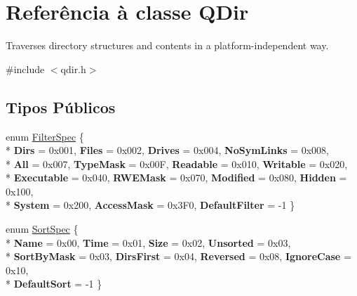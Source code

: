 \hypertarget{class_q_dir}{\section{Referência à classe Q\-Dir}
\label{class_q_dir}
}


Traverses directory structures and contents in a platform-\/independent way.  




{\ttfamily \#include $<$qdir.\-h$>$}

\subsection*{Tipos Públicos}
\begin{DoxyCompactItemize}
\item 
enum \hyperlink{class_q_dir_ae5939bcf9175d1742ed9c51e042efd50}{Filter\-Spec} \{ \\*
{\bfseries Dirs} = 0x001, 
{\bfseries Files} = 0x002, 
{\bfseries Drives} = 0x004, 
{\bfseries No\-Sym\-Links} = 0x008, 
\\*
{\bfseries All} = 0x007, 
{\bfseries Type\-Mask} = 0x00\-F, 
{\bfseries Readable} = 0x010, 
{\bfseries Writable} = 0x020, 
\\*
{\bfseries Executable} = 0x040, 
{\bfseries R\-W\-E\-Mask} = 0x070, 
{\bfseries Modified} = 0x080, 
{\bfseries Hidden} = 0x100, 
\\*
{\bfseries System} = 0x200, 
{\bfseries Access\-Mask} = 0x3\-F0, 
{\bfseries Default\-Filter} = -\/1
 \}
\item 
enum \hyperlink{class_q_dir_ab098a8b38ab309d7073f6920c4811af4}{Sort\-Spec} \{ \\*
{\bfseries Name} = 0x00, 
{\bfseries Time} = 0x01, 
{\bfseries Size} = 0x02, 
{\bfseries Unsorted} = 0x03, 
\\*
{\bfseries Sort\-By\-Mask} = 0x03, 
{\bfseries Dirs\-First} = 0x04, 
{\bfseries Reversed} = 0x08, 
{\bfseries Ignore\-Case} = 0x10, 
\\*
{\bfseries Default\-Sort} = -\/1
 \}
\end{DoxyCompactItemize}
